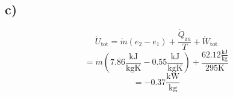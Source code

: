 

\subsection*{c)}
\[
\dot{U}_{\text{tot}} = \dot{m}(e_2 - e_1) + \frac{\dot{Q}_{\text{zu}}}{T} + \dot{W}_{\text{tot}}
\]
\[
= \dot{m} \left( 7.86 \frac{\text{kJ}}{\text{kgK}} - 0.55 \frac{\text{kJ}}{\text{kgK}} \right) + \frac{62.12 \frac{\text{kJ}}{\text{kg}}}{295 \text{K}}
\]
\[
= -0.37 \frac{\text{kW}}{\text{kg}}
\]
